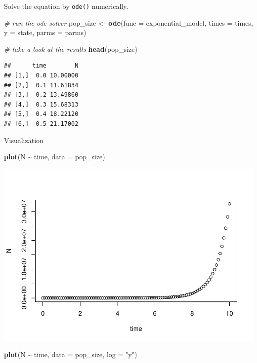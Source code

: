 \documentclass[
]{book}
\newenvironment{Shaded}{\begin{snugshade}}{\end{snugshade}}
\newcommand{\AttributeTok}[1]{\textcolor[rgb]{0.13,0.29,0.53}{#1}}
\newcommand{\CommentTok}[1]{\textcolor[rgb]{0.56,0.35,0.01}{\textit{#1}}}
\newcommand{\FunctionTok}[1]{\textcolor[rgb]{0.13,0.29,0.53}{\textbf{#1}}}
\newcommand{\NormalTok}[1]{#1}
\newcommand{\OtherTok}[1]{\textcolor[rgb]{0.56,0.35,0.01}{#1}}
\newcommand{\SpecialCharTok}[1]{\textcolor[rgb]{0.81,0.36,0.00}{\textbf{#1}}}
\newcommand{\StringTok}[1]{\textcolor[rgb]{0.31,0.60,0.02}{#1}}
\begin{document}
Solve the equation by \texttt{ode()} numerically.

\begin{Shaded}
\begin{Highlighting}[]
\CommentTok{\# run the ode solver}
\NormalTok{pop\_size }\OtherTok{\textless{}{-}} \FunctionTok{ode}\NormalTok{(}\AttributeTok{func =}\NormalTok{ exponential\_model, }\AttributeTok{times =}\NormalTok{ times, }\AttributeTok{y =}\NormalTok{ state, }\AttributeTok{parms =}\NormalTok{ parms)}

\CommentTok{\# take a look at the results}
\FunctionTok{head}\NormalTok{(pop\_size)}
\end{Highlighting}
\end{Shaded}

\begin{verbatim}
##      time        N
## [1,]  0.0 10.00000
## [2,]  0.1 11.61834
## [3,]  0.2 13.49860
## [4,]  0.3 15.68313
## [5,]  0.4 18.22120
## [6,]  0.5 21.17002
\end{verbatim}

Visualization

\begin{Shaded}
\begin{Highlighting}[]
\FunctionTok{plot}\NormalTok{(N }\SpecialCharTok{\textasciitilde{}}\NormalTok{ time, }\AttributeTok{data =}\NormalTok{ pop\_size)}
\end{Highlighting}
\end{Shaded}

\includegraphics{bookdown-demo_files/figure-latex/unnamed-chunk-5-1.pdf}

\begin{Shaded}
\begin{Highlighting}[]
\FunctionTok{plot}\NormalTok{(N }\SpecialCharTok{\textasciitilde{}}\NormalTok{ time, }\AttributeTok{data =}\NormalTok{ pop\_size, }\AttributeTok{log =} \StringTok{"y"}\NormalTok{)}
\end{Highlighting}
\end{Shaded}
\end{document}
